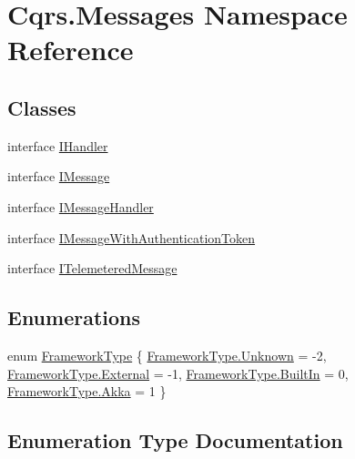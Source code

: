 \hypertarget{namespaceCqrs_1_1Messages}{}\section{Cqrs.\+Messages Namespace Reference}
\label{namespaceCqrs_1_1Messages}
\subsection*{Classes}
\begin{DoxyCompactItemize}
\item 
interface \hyperlink{interfaceCqrs_1_1Messages_1_1IHandler}{I\+Handler}
\item 
interface \hyperlink{interfaceCqrs_1_1Messages_1_1IMessage}{I\+Message}
\item 
interface \hyperlink{interfaceCqrs_1_1Messages_1_1IMessageHandler}{I\+Message\+Handler}
\item 
interface \hyperlink{interfaceCqrs_1_1Messages_1_1IMessageWithAuthenticationToken}{I\+Message\+With\+Authentication\+Token}
\item 
interface \hyperlink{interfaceCqrs_1_1Messages_1_1ITelemeteredMessage}{I\+Telemetered\+Message}
\end{DoxyCompactItemize}
\subsection*{Enumerations}
\begin{DoxyCompactItemize}
\item 
enum \hyperlink{namespaceCqrs_1_1Messages_af06a7e6cd2609043d0f2f5f3419f81e3}{Framework\+Type} \{ \hyperlink{namespaceCqrs_1_1Messages_af06a7e6cd2609043d0f2f5f3419f81e3a88183b946cc5f0e8c96b2e66e1c74a7e}{Framework\+Type.\+Unknown} = -\/2, 
\hyperlink{namespaceCqrs_1_1Messages_af06a7e6cd2609043d0f2f5f3419f81e3ab206a1b4ea1097761f78e8876f6da779}{Framework\+Type.\+External} = -\/1, 
\hyperlink{namespaceCqrs_1_1Messages_af06a7e6cd2609043d0f2f5f3419f81e3aca8f2e8d70641ce17b9b304086c19657}{Framework\+Type.\+Built\+In} = 0, 
\hyperlink{namespaceCqrs_1_1Messages_af06a7e6cd2609043d0f2f5f3419f81e3a1565c979ff6d5255fd3c81f57219fffc}{Framework\+Type.\+Akka} = 1
 \}
\end{DoxyCompactItemize}


\subsection{Enumeration Type Documentation}
\mbox{\label{namespaceCqrs_1_1Messages_af06a7e6cd2609043d0f2f5f3419f81e3}} 
